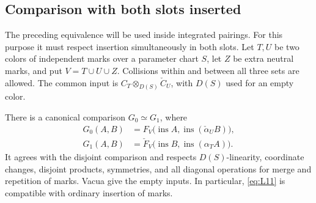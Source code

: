 \subsection{Comparison with both slots inserted}

The preceding equivalence will be used inside integrated pairings.
For this purpose it must respect insertion simultaneously in both
slots.  Let $T,U$ be two colors of independent marks over a parameter
chart $S$, let $Z$ be extra neutral marks, and put
$V=T\cup U\cup Z$.  Collisions within and between all three sets
are allowed.  The common input is
$C_T\otimes_{D(S)}\check C_U$, with $D(S)$ used for an empty color.

\begin{proposition}\label{local:two-slot}
There is a canonical comparison $G_0\simeq G_1$, where
\begin{equation}\label{eq:L12}
 \begin{aligned}
 G_0(A,B)&=F_V\bigl(\operatorname{ins}A,
                   \operatorname{ins}(\check\alpha_U B)\bigr),\\
 G_1(A,B)&=\check F_V\bigl(\operatorname{ins}B,
                   \operatorname{ins}(\alpha_T A)\bigr).
 \end{aligned}
\end{equation}
It agrees with the disjoint comparison and respects $D(S)$-linearity,
coordinate changes, disjoint products, symmetries, and all diagonal
operations for merge and repetition of marks.  Vacua give the empty
inputs.  In particular, \eqref{eq:L11} is compatible with ordinary
insertion of marks.
\end{proposition}

